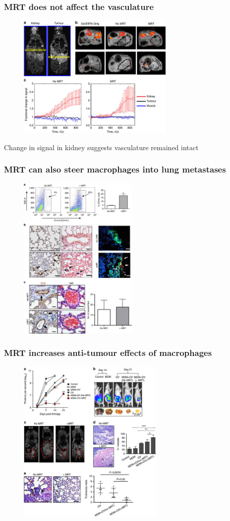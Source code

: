 \documentclass[8pt,xcolor=table]{beamer}
\begin{document}
\begin{frame}
\frametitle{MRT does not affect the vasculature}
 \begin{figure}
 \centering
 \includegraphics[height=6cm]{muthana_fig3_res}
 \end{figure} 
 
Change in signal in kidney suggests vasculature remained intact
 
\end{frame}

\begin{frame}
\frametitle{MRT can also steer macrophages into lung metastases}
 \begin{figure}
 \centering
 \includegraphics[height=8cm]{muthana_fig4_res}
 \end{figure}
\end{frame}

\begin{frame}
\frametitle{MRT increases anti-tumour effects of macrophages}
 \begin{figure}
 \centering
 \includegraphics[height=8cm]{muthana_fig5_res}
 \end{figure} 
\end{frame}
\end{document}

